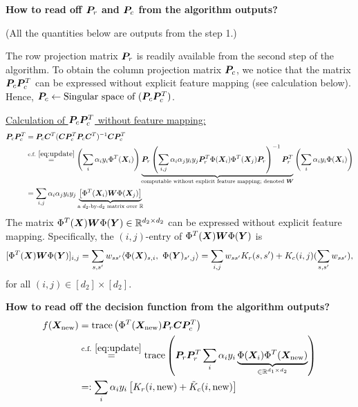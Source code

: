 \documentclass[11pt]{article}
\theoremstyle{plain}
\theoremstyle{definition}
\newcommand*{\KeepStyleUnderBrace}[1]{%
  \mathop{%
    \mathchoice
    {\underbrace{\displaystyle#1}}%
    {\underbrace{\textstyle#1}}%
    {\underbrace{\scriptstyle#1}}%
    {\underbrace{\scriptscriptstyle#1}}%
  }\limits
}
\begin{document}
{\bf How to read off $\bm{P}_r$ and $\bm{P}_c$ from the algorithm outputs?} 

(All the quantities below are outputs from the step 1.)

The row projection matrix $\bm{P}_r$ is readily available from the second step of the algorithm. To obtain the column projection matrix $\bm{P}_c$, we notice that the matrix $\bm{P}_c\bm{P}^T_c$ can be expressed without explicit feature mapping (see calculation below). Hence, $\bm{P}_c \leftarrow \text{Singular space of $(\bm{P}_c\bm{P}^T_c)$}$. 

\underline{Calculation of $\bm{P}_c\bm{P}^T_c$ without feature mapping:}
\begin{align}\label{eq:projection}
\mP_c\mP^T_c&=\mP_c\mC^T(\mC\mP^T_c\mP_c\mC^T)^{-1}\mC\mP^T_c\\
&\stackrel{\text{c.f.}~\eqref{eq:update}}{=}\left(\sum_i \alpha_i y_i\Phi^T(\mX_i) \right) \KeepStyleUnderBrace{\mP_r \left(\sum_{i,j}\alpha_i\alpha_jy_iy_j\mP^T_r\Phi(\mX_i)\Phi^T(\mX_j)\mP_r \right)^{-1}\mP^T_r}_{\text{computable without explicit feature mapping; denoted $\mW$}}\left(\sum_i \alpha_i y_i  \Phi(\mX_i)\right)\\
&=\sum_{i,j}\alpha_i \alpha_j y_iy_j \KeepStyleUnderBrace{\left[\Phi^T(\mX_i)\mW\Phi(\mX_j)\right]}_{\text{a $d_2$-by-$d_2$ matrix over $\mathbb{R}$}}
\end{align}
The matrix $\Phi^T(\bm X)\bm{W}\Phi(\bm Y)\in\mathbb{R}^{d_2\times d_2}$ can be expressed without explicit feature mapping. Specifically, the $(i,j)$-entry of $\Phi^T(\bm X)\bm{W}\Phi(\bm Y)$ is
\[
[\Phi^T(\bm X)\bm{W}\Phi(\bm Y)]_{i,j}=\sum_{s,s'}w_{ss'}\langle \Phi(\bm X)_{s,i},\ \Phi(\bm Y)_{s',j}\rangle = \sum_{i,j}w_{ss'}K_r(s,s')+K_c(i,j)(\sum_{s,s'}w_{ss'}),
\]
for all $(i,j)\in[d_2]\times [d_2].$

{\bf How to read off the decision function from the algorithm outputs?} 
\begin{align}
f(\mX_{\text{new}}) &= \text{trace}\left(\Phi^T(\mX_{\text{new}})\mP_r\mC\mP^T_c\right) \\
&\stackrel{\text{c.f.}~\eqref{eq:update}}{=} \text{trace}\left( \mP_r\mP^T_r \sum_{i}\alpha_i y_i \KeepStyleUnderBrace{\Phi(\mX_i)\Phi^T(\mX_{\text{new}})}_{\in \mathbb{R}^{d_1\times d_2}} \right)\\
&=:\sum_i \alpha_i y_i \left[K_r(i,\text{new})+\tilde K_c(i,\text{new})\right]
\end{align}
\end{document}
